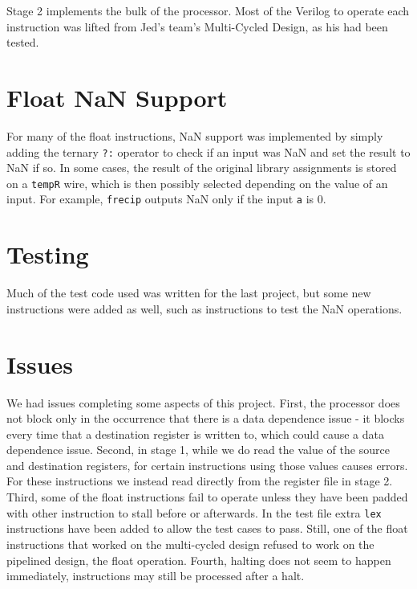 \documentclass{sig-alternate-05-2015}
\begin{document}
Stage 2 implements the bulk of the processor. Most of the Verilog to operate each instruction was lifted from Jed's team's Multi-Cycled Design, as his had been tested.

\vfill\pagebreak

\section{Float NaN Support}

For many of the float instructions, NaN support was implemented by simply adding the ternary \texttt{?:} operator to check if an input was NaN and set the result to NaN if so. In some cases, the result of the original library assignments is stored on a \texttt{tempR} wire, which is then possibly selected depending on the value of an input. For example, \texttt{frecip} outputs NaN only if the input \texttt{a} is 0.

\section{Testing}

Much of the test code used was written for the last project, but some new instructions were added as well, such as instructions to test the NaN operations.

\section{Issues}

We had issues completing some aspects of this project. First, the processor does not block only in the occurrence that there is a data dependence issue - it blocks every time that a destination register is written to, which could cause a data dependence issue. Second, in stage 1, while we do read the value of the source and destination registers, for certain instructions using those values causes errors. For these instructions we instead read directly from the register file in stage 2. Third, some of the float instructions fail to operate unless they have been padded with other instruction to stall before or afterwards. In the test file extra \texttt{lex} instructions have been added to allow the test cases to pass. Still, one of the float instructions that worked on the multi-cycled design refused to work on the pipelined design, the float operation. Fourth, halting does not seem to happen immediately, instructions may still be processed after a halt.
\end{document}
